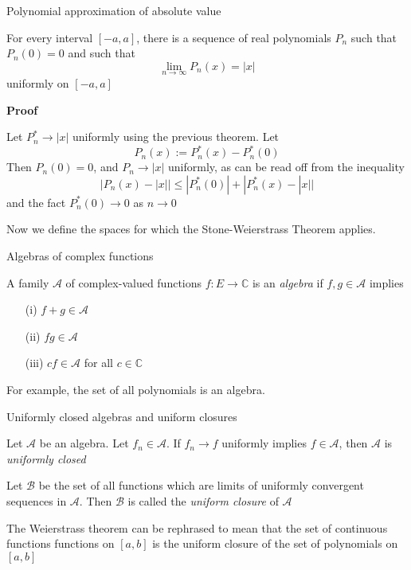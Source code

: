 \begin{theorem}Polynomial approximation of absolute value

    For every interval $[-a, a]$, there is a sequence of real polynomials $P_n$ such that $P_n(0) = 0$ and such that
    \[\lim_{n \to \infty} P_n(x) = |x|\]
    uniformly on $[-a, a]$

    \textbf{Proof}

    Let $P_n^\ast \rightarrow |x|$ uniformly using the previous theorem. Let 
    \[P_n(x) := P_n^\ast(x) - P_n^\ast(0)\]
    Then $P_n(0) = 0$, and $P_n \rightarrow |x|$ uniformly, as can be read off from the inequality
    \[|P_n(x) - |x|| \leq |P_n^\ast(0)| + |P_n^\ast(x) - |x||\]
    and the fact $P_n^\ast(0) \to 0$ as $n \to 0$
\end{theorem}

Now we define the spaces for which the Stone-Weierstrass Theorem applies.

\begin{definition}Algebras of complex functions

    A family $\mathscr{A}$ of complex-valued functions $f: E \rightarrow \mathbb{C}$ is an \textit{algebra} if $f, g \in \mathscr{A}$ implies 
    \begin{itemize}
        \item[(i)] $f + g \in \mathscr{A}$
        \item[(ii)] $fg \in \mathscr{A}$
        \item[(iii)] $cf \in \mathscr{A}$ for all $c \in \mathbb{C}$
    \end{itemize}
\end{definition}

For example, the set of all polynomials is an algebra.

\begin{definition}Uniformly closed algebras and uniform closures

    Let $\mathscr{A}$ be an algebra. Let $f_n \in \mathscr{A}$. If $f_n \rightarrow f$ uniformly implies $f \in \mathscr{A}$, then $\mathscr{A}$ is \textit{uniformly closed}

    Let $\mathscr{B}$ be the set of all functions which are limits of uniformly convergent sequences in $\mathscr{A}$. Then $\mathscr{B}$ is called the \textit{uniform closure} of $\mathscr{A}$
\end{definition}

The Weierstrass theorem can be rephrased to mean that the set of continuous functions functions on $[a, b]$ is the uniform closure of the set of polynomials on $[a, b]$

